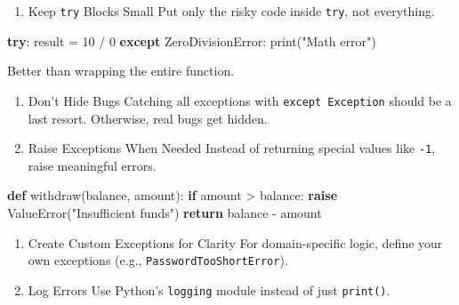 \documentclass[
  letterpaper,
  DIV=11,
  numbers=noendperiod]{scrreprt}
\newenvironment{Shaded}{\begin{snugshade}}{\end{snugshade}}
\newcommand{\BuiltInTok}[1]{\textcolor[rgb]{0.00,0.23,0.31}{#1}}
\newcommand{\ControlFlowTok}[1]{\textcolor[rgb]{0.00,0.23,0.31}{\textbf{#1}}}
\newcommand{\DecValTok}[1]{\textcolor[rgb]{0.68,0.00,0.00}{#1}}
\newcommand{\KeywordTok}[1]{\textcolor[rgb]{0.00,0.23,0.31}{\textbf{#1}}}
\newcommand{\NormalTok}[1]{\textcolor[rgb]{0.00,0.23,0.31}{#1}}
\newcommand{\OperatorTok}[1]{\textcolor[rgb]{0.37,0.37,0.37}{#1}}
\newcommand{\PreprocessorTok}[1]{\textcolor[rgb]{0.68,0.00,0.00}{#1}}
\newcommand{\StringTok}[1]{\textcolor[rgb]{0.13,0.47,0.30}{#1}}
\providecommand{\tightlist}{%
  \setlength{\itemsep}{0pt}\setlength{\parskip}{0pt}}
\begin{document}
\begin{enumerate}
\def\labelenumi{\arabic{enumi}.}
\setcounter{enumi}{2}
\tightlist
\item
  Keep \texttt{try} Blocks Small Put only the risky code inside
  \texttt{try}, not everything.
\end{enumerate}

\begin{Shaded}
\begin{Highlighting}[]
\ControlFlowTok{try}\NormalTok{:}
\NormalTok{    result }\OperatorTok{=} \DecValTok{10} \OperatorTok{/} \DecValTok{0}
\ControlFlowTok{except} \PreprocessorTok{ZeroDivisionError}\NormalTok{:}
    \BuiltInTok{print}\NormalTok{(}\StringTok{"Math error"}\NormalTok{)}
\end{Highlighting}
\end{Shaded}

Better than wrapping the entire function.

\begin{enumerate}
\def\labelenumi{\arabic{enumi}.}
\setcounter{enumi}{3}
\item
  Don't Hide Bugs Catching all exceptions with
  \texttt{except\ Exception} should be a last resort. Otherwise, real
  bugs get hidden.
\item
  Raise Exceptions When Needed Instead of returning special values like
  \texttt{-1}, raise meaningful errors.
\end{enumerate}

\begin{Shaded}
\begin{Highlighting}[]
\KeywordTok{def}\NormalTok{ withdraw(balance, amount):}
    \ControlFlowTok{if}\NormalTok{ amount }\OperatorTok{\textgreater{}}\NormalTok{ balance:}
        \ControlFlowTok{raise} \PreprocessorTok{ValueError}\NormalTok{(}\StringTok{"Insufficient funds"}\NormalTok{)}
    \ControlFlowTok{return}\NormalTok{ balance }\OperatorTok{{-}}\NormalTok{ amount}
\end{Highlighting}
\end{Shaded}

\begin{enumerate}
\def\labelenumi{\arabic{enumi}.}
\setcounter{enumi}{5}
\item
  Create Custom Exceptions for Clarity For domain-specific logic, define
  your own exceptions (e.g., \texttt{PasswordTooShortError}).
\item
  Log Errors Use Python's \texttt{logging} module instead of just
  \texttt{print()}.
\end{enumerate}
\end{document}
